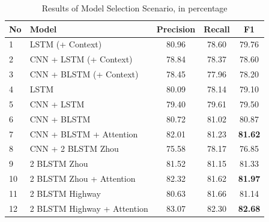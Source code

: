 {{\begin{table}
	\caption{Results of Model Selection Scenario, in percentage}
	\centering
	\label{tab:architecture_scenario}
	\begin{tabular}{llccc}
		\hline
		No & Model & Precision & Recall & F1 \\
		\hline\hline
		1 & LSTM (+ Context) & 80.96 & 78.60 & 79.76 \\
		2 & CNN + LSTM (+ Context) & 78.84 & 78.37 & 78.60 \\
		3 & CNN + BLSTM (+ Context) & 78.45 & 77.96 & 78.20 \\
		4 & LSTM & 80.09 & 78.14 & 79.10 \\
		5 & CNN + LSTM & 79.40 & 79.61 & 79.50 \\
		6 & CNN + BLSTM & 80.72 & 81.02 & 80.87 \\
		7 & CNN + BLSTM + Attention & 82.01 & 81.23 & \textbf{81.62} \\
		8 & CNN + 2 BLSTM Zhou & 75.58 & 78.17 & 76.85 \\
		9 & 2 BLSTM Zhou & 81.52 & 81.15 & 81.33 \\
		10 & 2 BLSTM Zhou + Attention & 82.32 & 81.62 & \textbf{81.97} \\
		11 & 2 BLSTM Highway & 80.63 & 81.66 & 81.14 \\
		12 & 2 BLSTM Highway + Attention & 83.07 & 82.30 & \textbf{82.68} \\
		\hline
	\end{tabular}

\end{table}

}}
